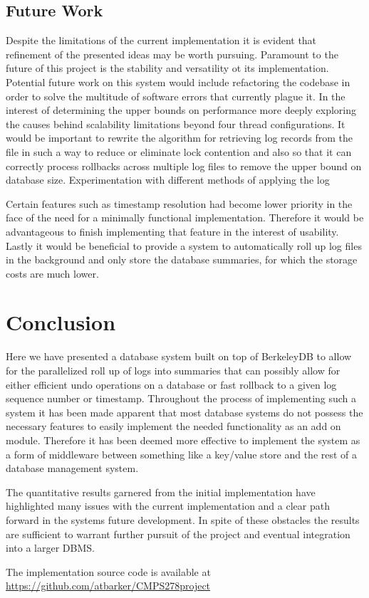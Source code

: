 \documentclass{article}
\begin{document}
\subsection{Future Work}
Despite the limitations of the current implementation it is evident that refinement of the presented ideas may be worth pursuing. 
Paramount to the future of this project is the stability and versatility ot its implementation. Potential future work on this system would include refactoring the codebase in order to solve the multitude of software errors that currently plague it. In the interest of determining the upper bounds on performance more deeply exploring the causes behind scalability limitations beyond four thread configurations. It would be important to rewrite the algorithm for retrieving log records from the file in such a way to reduce or eliminate lock contention and also so that it can correctly process rollbacks across multiple log files to remove the upper bound on database size. Experimentation with different methods of applying the log 

Certain features such as timestamp resolution had become lower priority in the face of the need for a minimally functional implementation. Therefore it would be advantageous to finish implementing that feature in the interest of usability. Lastly it would be beneficial to provide a system to automatically roll up log files in the background and only store the database summaries, for which the storage costs are much lower. 

\section{Conclusion}
Here we have presented a database system built on top of BerkeleyDB to allow for the parallelized roll up of logs into summaries that can possibly allow for either efficient undo operations on a database or fast rollback to a given log sequence number or timestamp. Throughout the process of implementing such a system it has been made apparent that most database systems do not possess the necessary features to easily implement the needed functionality as an add on module. Therefore it has been deemed more effective to implement the system as a form of middleware between something like a key/value store and the rest of a database management system. 

The quantitative results garnered from the initial implementation have highlighted many issues with the current implementation and a clear path forward in the systems future development. In spite of these obstacles the results are sufficient to warrant further pursuit of the project and eventual integration into a larger DBMS.

The implementation source code is available at \url{https://github.com/atbarker/CMPS278project}



\end{document}
